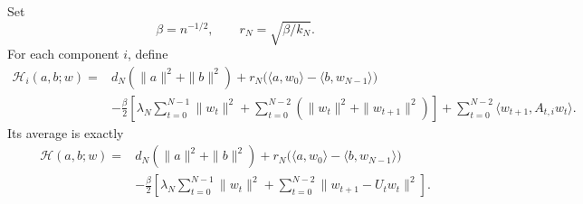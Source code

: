 \documentclass[11pt,letterpaper]{article}
\theoremstyle{definition}
\theoremstyle{remark}
\begin{document}
Set
\begin{equation}
 \beta=n^{-1/2},\qquad r_N=\sqrt{\beta/k_N}.
 \label{eq:long-relay-coefficients}
\end{equation}
For each component $i$, define
\begin{equation}
\begin{split}
 \mathcal H_i(a,b;w)
 ={}&d_N(\|a\|^2+\|b\|^2)
       +r_N\bigl(\langle a,w_0\rangle
                   -\langle b,w_{N-1}\rangle\bigr)\\
 &-\frac\beta2\left[
      \lambda_N\sum_{t=0}^{N-1}\|w_t\|^2
      +\sum_{t=0}^{N-2}(\|w_t\|^2+\|w_{t+1}\|^2)
   \right]
   +\sum_{t=0}^{N-2}\langle w_{t+1},A_{t,i}w_t\rangle.
\end{split}
\label{eq:long-component}
\end{equation}
Its average is exactly
\begin{equation}
\begin{split}
 \mathcal H(a,b;w)
 ={}&d_N(\|a\|^2+\|b\|^2)
       +r_N\bigl(\langle a,w_0\rangle
                   -\langle b,w_{N-1}\rangle\bigr)\\
 &-\frac\beta2\left[
     \lambda_N\sum_{t=0}^{N-1}\|w_t\|^2
     +\sum_{t=0}^{N-2}\|w_{t+1}-U_tw_t\|^2
   \right].
\end{split}
\label{eq:long-average}
\end{equation}
\end{document}
